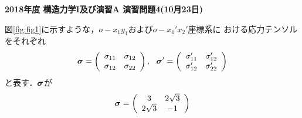 \documentclass[10pt,a4j]{jarticle}
\newlength{\minitwocolumn}
\begin{document}
\newcommand{\fat}[1]{\mbox{\boldmath $#1$}}
\newcommand{\D}{\partial}
\newcommand{\w}{\omega}
\newcommand{\ga}{\alpha}
\newcommand{\gb}{\beta}
\newcommand{\gx}{\xi}
\newcommand{\gz}{\zeta}
\newcommand{\vhat}[1]{\hat{\fat{#1}}}
\newcommand{\spc}{\vspace{0.7\baselineskip}}
\newcommand{\halfspc}{\vspace{0.3\baselineskip}}

\pagestyle{empty}
\newcommand{\twofig}[2]
 {
   \begin{figure}[here]
     \begin{minipage}[t]{\minitwocolumn}
         \begin{center}   #1
         \end{center}
     \end{minipage}
         \hspace{\columnsep}
     \begin{minipage}[t]{\minitwocolumn}
         \begin{center} #2
         \end{center}
     \end{minipage}
   \end{figure}
 }
\begin{center}
{\Large \bf 2018年度 構造力学I及び演習A 演習問題4(10月23日)} \\
\end{center}
\vspace{15mm}
	図\ref{fig:fig1}に示すような，$o-x_1 y_1$および$o-x_1'x_2'$座標系に
	おける応力テンソルをそれぞれ
\[
	\fat{\sigma}
	=
	\left( 
		\begin{array}{cc}
		\sigma_{11} & \sigma_{12} \\
		\sigma_{12} & \sigma_{22} 
		\end{array}
	\right)
	, 
	\ \
	\fat{\sigma}'
	=
	\left( 
		\begin{array}{cc}
		\sigma_{11}' & \sigma_{12}' \\
		\sigma_{12}' & \sigma_{22}'
		\end{array}
	\right)
\]
	と表す．$\fat{\sigma}$が
\begin{equation}
	\fat{\sigma}
	=
	\left( 
		\begin{array}{cc}
		3 & 2\sqrt{3} \\
		2\sqrt{3} &  -1
		\end{array}
	\right)
	\label{eqn:sigma}
\end{equation}
\end{document}
